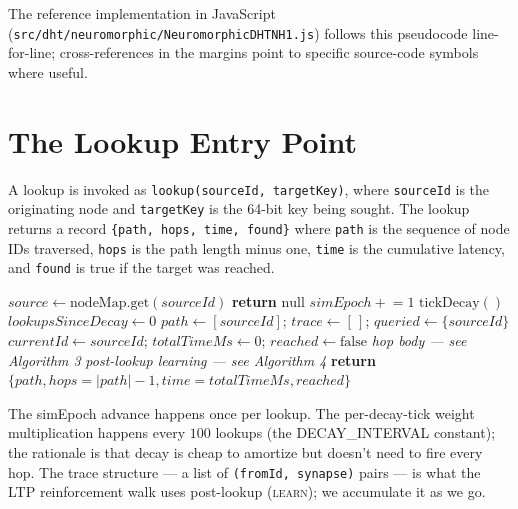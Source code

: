 \documentclass[twoside,nobib]{tufte-book}
\begin{document}
The reference implementation in JavaScript
(\texttt{src/dht/neuromorphic/NeuromorphicDHTNH1.js}) follows
this pseudocode line-for-line; cross-references in the margins
point to specific source-code symbols where useful.

\section{The Lookup Entry Point}

A lookup is invoked as \texttt{lookup(sourceId, targetKey)},
where \texttt{sourceId} is the originating node and
\texttt{targetKey} is the 64-bit key being sought. The lookup
returns a record \texttt{\{path, hops, time, found\}} where
\texttt{path} is the sequence of node IDs traversed, \texttt{hops}
is the path length minus one, \texttt{time} is the cumulative
latency, and \texttt{found} is true if the target was reached.

\begin{algorithm}
\caption{lookup(sourceId, targetKey) --- top level}
\begin{algorithmic}[1]
\State $\mathit{source} \gets \mathrm{nodeMap.get}(sourceId)$
  \State \textbf{return} $\mathrm{null}$
\EndIf
\State $\mathit{simEpoch} \mathrel{+}= 1$
  \State $\mathrm{tickDecay}()$
  \State $\mathit{lookupsSinceDecay} \gets 0$
\EndIf
\State $\mathit{path} \gets [sourceId]$;
       $\mathit{trace} \gets [\,]$;
       $\mathit{queried} \gets \{sourceId\}$
\State $\mathit{currentId} \gets sourceId$;
       $\mathit{totalTimeMs} \gets 0$;
       $\mathit{reached} \gets \mathrm{false}$
  \State \emph{hop body --- see Algorithm 3}
\EndFor
{}
  \State \emph{post-lookup learning --- see Algorithm 4}
\EndIf
\State \textbf{return}
       $\{\mathit{path}, \mathit{hops}=|\mathit{path}|-1,
       \mathit{time}=\mathit{totalTimeMs}, \mathit{reached}\}$
\end{algorithmic}
\end{algorithm}

The simEpoch advance happens once per lookup. The per-decay-tick
weight multiplication happens every $100$ lookups (the
\textsc{DECAY\_INTERVAL} constant); the rationale is that decay
is cheap to amortize but doesn't need to fire every hop. The
trace structure --- a list of \texttt{(fromId, synapse)} pairs
--- is what the LTP reinforcement walk uses post-lookup
(\textsc{learn}); we accumulate it as we go.
\end{document}
